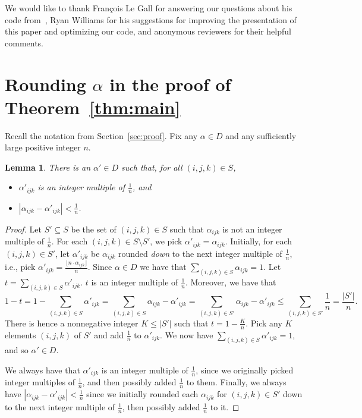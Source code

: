 \PassOptionsToPackage{shortlabels}{enumitem}\documentclass[10pt,a4paper]{article}
\newtheorem{lemma}{Lemma}[section]
\begin{document}
We would like to thank Fran{\c{c}}ois Le Gall for answering our questions about his code from~\cite{legall},  Ryan Williams for his suggestions for improving the presentation of this paper and optimizing our code, and anonymous reviewers for their helpful comments. 
 




\appendix 

\section{Rounding \texorpdfstring{$\alpha$}{alpha} in the proof of \texorpdfstring{Theorem~\ref{thm:main}}{Theorem 4.1}}\label{app:rounding}

Recall the notation from Section~\ref{sec:proof}. Fix any $\alpha \in D$ and any sufficiently large positive integer $n$. 

\begin{lemma}
There is an $\alpha' \in D$ such that, for all $(i,j,k) \in S$,
\begin{itemize}
    \item $\alpha'_{ijk}$ is an integer multiple of $\frac{1}{n}$, and
    \item $|\alpha_{ijk} - \alpha'_{ijk}| < \frac{1}{n}$.
\end{itemize}
\end{lemma}

\begin{proof}
Let $S' \subseteq S$ be the set of $(i,j,k) \in S$ such that $\alpha_{ijk}$ is not an integer multiple of $\frac{1}{n}$.
For each $(i,j,k) \in S \setminus S'$, we pick $\alpha'_{ijk} = \alpha_{ijk}$. Initially, for each $(i,j,k) \in S'$, let $\alpha'_{ijk}$ be $\alpha_{ijk}$ rounded \emph{down} to the next integer multiple of $\frac{1}{n}$, i.e., pick $\alpha'_{ijk} = \frac{\lfloor n \cdot \alpha_{ijk} \rfloor}{n}$. Since $\alpha \in D$ we have that $\sum_{(i,j,k) \in S} \alpha_{ijk} = 1$. Let $t = \sum_{(i,j,k) \in S} \alpha'_{ijk}$. $t$ is an integer multiple of $\frac{1}{n}$. Moreover, we have that
$$1 - t = 1 - \sum_{(i,j,k) \in S} \alpha'_{ijk} = \sum_{(i,j,k) \in S} \alpha_{ijk} - \alpha'_{ijk} =  \sum_{(i,j,k) \in S'} \alpha_{ijk} - \alpha'_{ijk} \leq \sum_{(i,j,k) \in S'} \frac{1}{n} = \frac{|S'|}{n}.$$
There is hence a nonnegative integer $K \leq |S'|$ such that $t = 1 - \frac{K}{n}$. Pick any $K$ elements $(i,j,k)$ of $S'$ and add $\frac{1}{n}$ to $\alpha'_{ijk}$. We now have $\sum_{(i,j,k) \in S} \alpha'_{ijk} = 1$, and so $\alpha' \in D$.

We always have that $\alpha'_{ijk}$ is an integer multiple of $\frac{1}{n}$, since we originally picked integer multiples of $\frac{1}{n}$, and then possibly added $\frac{1}{n}$ to them. Finally, we always have $|\alpha_{ijk} - \alpha'_{ijk}| < \frac{1}{n}$ since we initially rounded each $\alpha_{ijk}$ for $(i,j,k) \in S'$ down to the next integer multiple of $\frac{1}{n}$, then possibly added $\frac{1}{n}$ to it.
\end{proof}
\end{document}
